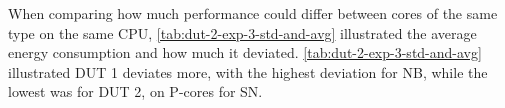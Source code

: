 

When comparing how much performance could differ between cores of the same type on the same CPU, \cref{tab:dut-2-exp-3-std-and-avg} illustrated the average energy consumption and how much it deviated. \cref{tab:dut-2-exp-3-std-and-avg} illustrated DUT 1 deviates more, with the highest deviation for NB, while the lowest was for DUT 2, on P-cores for SN.










